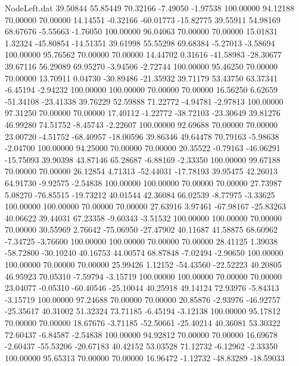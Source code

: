 \begin{filecontents}{NodeLeft.dat}
  39.50844   55.85449   70.32166    -7.49050   -1.97538  100.00000   94.12188   70.00000   70.00000   14.14551   -0.32166  -60.01773  -15.82775
  39.55911   54.98169   68.67676    -5.55663   -1.76050  100.00000   96.04063   70.00000   70.00000   15.01831    1.32324  -45.80854  -14.51351
  39.61998   55.55298   69.68384    -5.27013   -3.58694  100.00000   95.76562   70.00000   70.00000   14.44702    0.31616  -41.58983  -28.30677
  39.67116   56.29089   69.95270    -3.94506   -2.72744  100.00000   95.46250   70.00000   70.00000   13.70911    0.04730  -30.89486  -21.35932
  39.71179   53.43750   63.37341    -6.45194   -2.94232  100.00000  100.00000   70.00000   70.00000   16.56250    6.62659  -51.34108  -23.41338
  39.76229   52.59888   71.22772    -4.94781   -2.97813  100.00000   97.31250   70.00000   70.00000   17.40112   -1.22772  -38.72103  -23.30649
  39.81276   46.99280   74.51752    -8.45743   -2.22607  100.00000   92.69688   70.00000   70.00000   23.00720   -4.51752  -68.40957  -18.00596
  39.86346   49.64478   70.79163    -5.98638   -2.04700  100.00000   94.25000   70.00000   70.00000   20.35522   -0.79163  -46.06291  -15.75093
  39.90398   43.87146   65.28687    -6.88169   -2.33350  100.00000   99.67188   70.00000   70.00000   26.12854    4.71313  -52.44031  -17.78193
  39.95475   42.26013   64.91730    -9.92575   -2.54838  100.00000  100.00000   70.00000   70.00000   27.73987    5.08270  -76.85515  -19.73212
  40.01544   42.36084   66.02539    -8.77975   -3.33625  100.00000  100.00000   70.00000   70.00000   27.63916    3.97461  -67.98167  -25.83263
  40.06622   39.44031   67.23358    -9.60343   -3.51532  100.00000  100.00000   70.00000   70.00000   30.55969    2.76642  -75.06950  -27.47902
  40.11687   41.58875   68.60962    -7.34725   -3.76600  100.00000  100.00000   70.00000   70.00000   28.41125    1.39038  -58.72800  -30.10240
  40.16753   44.00574   68.87848    -7.02494   -2.90650  100.00000  100.00000   70.00000   70.00000   25.99426    1.12152  -54.43560  -22.52223
  40.20805   46.95923   70.05310    -7.59794   -3.15719  100.00000  100.00000   70.00000   70.00000   23.04077   -0.05310  -60.40546  -25.10044
  40.25918   49.14124   72.93976    -5.84313   -3.15719  100.00000   97.24688   70.00000   70.00000   20.85876   -2.93976  -46.92757  -25.35617
  40.31002   51.32324   73.71185    -6.45194   -3.12138  100.00000   95.17812   70.00000   70.00000   18.67676   -3.71185  -52.50661  -25.40214
  40.36081   53.30322   72.60437    -6.84587   -2.54838  100.00000   94.92812   70.00000   70.00000   16.69678   -2.60437  -55.53206  -20.67183
  40.42152   53.03528   71.12732    -6.12962   -2.33350  100.00000   95.65313   70.00000   70.00000   16.96472   -1.12732  -48.83289  -18.59033

\end{filecontents}
